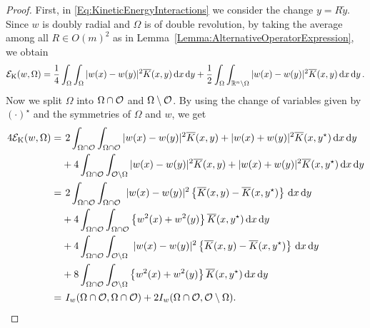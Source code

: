 \begin{proof}
	
First, in \eqref{Eq:KineticEnergyInteractions} we consider the change $ y = R\tilde{y}$. Since $w$ is doubly radial and $\Omega$ is of double revolution, by taking the average among all $R\in O(m)^2$ as in Lemma~\ref{Lemma:AlternativeOperatorExpression}, we obtain 
$$
\mathcal{E}_\mathrm{K}(w, \Omega) = \frac{1}{4} \int_{\Omega} \int_{\Omega} |w(x)-w(y)|^2 \overline{K}(x,y) \,\mathrm{d} x \,\mathrm{d} y + \frac{1}{2} \int_{\Omega} \int_{\mathbb{R}^n \setminus \Omega} |w(x)-w(y)|^2 \overline{K}(x,y) \,\mathrm{d} x \,\mathrm{d} y\,.
$$
Now we split $\Omega$ into $\Omega \cap \mathcal{O}$ and $\Omega \setminus \mathcal{O}$. By using the change of variables given by $(\cdot)^\star$ and the symmetries of $\Omega$ and $w$, we get
\begin{align*}
4\ecal_\mathrm{K}(w, \Omega) =   & \hspace{1.3mm} 2 \int_{\Omega\cap \ocal} \int_{\Omega \cap \ocal} |w(x)-w(y)|^2 \overline{K}(x,y) + |w(x)+w(y)|^2 \overline{K}(x,y^\star) \d x \d y  \\
& +  4\int_{\Omega\cap \ocal} \int_{\ocal \setminus \Omega} |w(x)-w(y)|^2 \overline{K}(x,y) + |w(x)+w(y)|^2 \overline{K}(x,y^\star) \d x \d y  \\
= & \hspace{1.3mm} 2 \int_{\Omega\cap \ocal} \int_{\Omega \cap \ocal}  \ |w(x)-w(y)|^2 \left\{ \overline{K}(x,y) - \overline{K}(x,y^\star) \right\} \d x \d y \\
&+4 \int_{\Omega\cap \ocal} \int_{\Omega\cap \ocal} \left\{w^2(x)+w^2(y)\right\} \overline{K}(x,y^\star) \d x \d y\,\\
&+ 4\int_{\Omega\cap \ocal} \int_{\ocal \setminus \Omega}  \ |w(x)-w(y)|^2 \left\{ \overline{K}(x,y) - \overline{K}(x,y^\star) \right\} \d x \d y\\
  & +8 \int_{\Omega\cap \ocal} \int_{\ocal \setminus \Omega}  \left\{w^2(x)+w^2(y)\right\} \overline{K}(x,y^\star) \d x \d y\,\\
= & \hspace{1.3mm}  I_w(\Omega\cap\ocal,\Omega\cap\ocal) + 2 I_w(\Omega\cap\ocal,\ocal\setminus\Omega).
\end{align*}
\end{proof}

